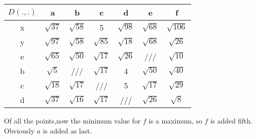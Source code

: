 \documentclass[11pt,a4paper,oneside]{article}
\begin{document}
\begin{table}[H]
\centering
\def\arraystretch{1.2}
\begin{tabular}{|c|c|c|c|c|c|c|}
\hline 
$D(.,.)$ & a & b & c & d & e & f \\ 
\hline 
x & $\sqrt{37}$ & $\sqrt{58}$ & 5 & $\sqrt{98}$ & $\sqrt{68}$ & $\sqrt{106}$ \\ 
\hline 
y & $\sqrt{97}$ & $\sqrt{58}$ & $\sqrt{85}$ & $\sqrt{18}$ & $\sqrt{68}$ & $\sqrt{26}$ \\ 
\hline
e & $\sqrt{65}$ & $\sqrt{50}$ & $\sqrt{17}$ & $\sqrt{26}$ & /// & $\sqrt{10}$ \\
\hline
b & $\sqrt{5}$ & /// & $\sqrt{17}$ & 4 & $\sqrt{50}$ & $\sqrt{40}$ \\
\hline 
c & $\sqrt{18}$ & $\sqrt{17}$ & /// & 5 & $\sqrt{17}$ & $\sqrt{29}$ \\
\hline 
d & $\sqrt{37}$ & $\sqrt{16}$ & $\sqrt{17}$ & /// & $\sqrt{26}$ & $\sqrt{8}$ \\
\hline
\end{tabular} 
\end{table}
\noindent
Of all the points,now the minimum value for $f$ is a maximum, so $f$ is added fifth. Obviously $a$ is added as last.
\end{document}
